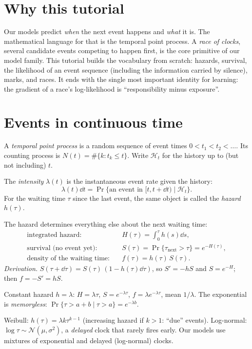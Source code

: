 \documentclass[11pt]{article}
\begin{document}

\section*{Why this tutorial}
Our models predict \emph{when} the next event happens and \emph{what} it is. The mathematical language for that is the
temporal point process. A \emph{race of clocks}, several candidate events competing to happen first, is the core primitive of
our model family. This tutorial builds the vocabulary from scratch: hazards, survival, the likelihood of an event sequence
(including the information carried by silence), marks, and races. It ends with the single most important identity for
learning: the gradient of a race's log-likelihood is ``responsibility minus exposure''.

\section{Events in continuous time}
A \emph{temporal point process} is a random sequence of event times $0<t_1<t_2<\dots$. Its counting process is
$N(t)=\#\{k: t_k\le t\}$. Write $\mathcal H_t$ for the history up to (but not including) $t$.

\begin{definition}
The \emph{intensity} $\lambda(t)$ is the instantaneous event rate given the history:
\[
\lambda(t)\dd t = \Pr\{\text{an event in }[t,t+\dd t)\mid \mathcal H_t\}.
\]
For the waiting time $\tau$ since the last event, the same object is called the \emph{hazard} $h(\tau)$.
\end{definition}

The hazard determines everything else about the next waiting time:
\begin{align*}
\text{integrated hazard:}&\quad H(\tau)=\int_0^\tau h(s)\dd s,\\
\text{survival (no event yet):}&\quad S(\tau)=\Pr\{\tau_{\text{next}}>\tau\}=e^{-H(\tau)},\\
\text{density of the waiting time:}&\quad f(\tau)=h(\tau)\,S(\tau).
\end{align*}
\emph{Derivation.} $S(\tau+\dd\tau)=S(\tau)\,(1-h(\tau)\dd\tau)$, so $S'=-hS$ and $S=e^{-H}$; then $f=-S'=hS$.

\begin{example}
Constant hazard $h=\lambda$: $H=\lambda\tau$, $S=e^{-\lambda\tau}$, $f=\lambda e^{-\lambda\tau}$, mean $1/\lambda$.
The exponential is \emph{memoryless}: $\Pr\{\tau>a+b\mid \tau>a\}=e^{-\lambda b}$.
\end{example}
\begin{example}
Weibull: $h(\tau)=\lambda k\tau^{k-1}$ (increasing hazard if $k>1$: ``due'' events). Log-normal: $\log\tau\sim\mathcal N(\mu,\sigma^2)$,
a \emph{delayed} clock that rarely fires early. Our models use mixtures of exponential and delayed (log-normal) clocks.
\end{example}
\end{document}
